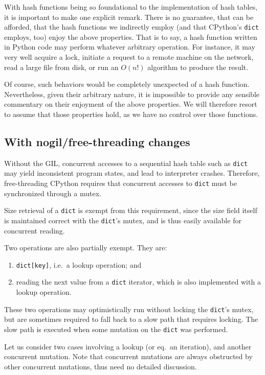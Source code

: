 With hash functions being so foundational to the implementation of hash tables, it is important to make one explicit remark.
There is no guarantee, that can be afforded, that the hash functions we indirectly employ (and that CPython's \texttt{dict} employs, too) enjoy the above properties.
That is to say, a hash function written in Python code may perform whatever arbitrary operation.
For instance, it may very well acquire a lock, initiate a request to a remote machine on the network, read a large file from disk, or run an $O(n!)$ algorithm to produce the result.

Of course, such behaviors would be completely unexpected of a hash function.
Nevertheless, given their arbitrary nature, it is impossible to provide any sensible commentary on their enjoyment of the above properties.
We will therefore resort to assume that those properties hold, as we have no control over those functions.


\subsection{With nogil/free-threading changes}\label{subsec:dict-free-threading}

Without the GIL, concurrent accesses to a sequential hash table such as \texttt{dict} may yield inconsistent program states, and lead to interpreter crashes.
Therefore, free-threading CPython requires that concurrent accesses to \texttt{dict} must be synchronized through a mutex.

Size retrieval of a \texttt{dict} is exempt from this requirement, since the size field itself is maintained correct with the \texttt{dict}'s mutex, and is thus easily available for concurrent reading.

Two operations are also partially exempt.
They are:
\begin{enumerate}
	\item \texttt{{dict[key]}}, i.e.\ a lookup operation; and
	\item reading the next value from a \texttt{dict} iterator, which is also implemented with a lookup operation.
\end{enumerate}
These two operations may optimistically run without locking the \texttt{dict}'s mutex, but are sometimes required to fall back to a slow path that requires locking.
The slow path is executed when some mutation on the \texttt{dict} was performed.

Let us consider two cases involving a lookup (or eq.\ an iteration), and another concurrent mutation.
Note that concurrent mutations are always obstructed by other concurrent mutations, thus need no detailed discussion.


